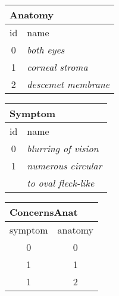 \begin{figure}[p]
    \begin{minipage}[][\textheight][c]{\textwidth}
        \begin{subfigure}{\linewidth}
            \centering
            \begin{adjustbox}{varwidth=\linewidth, max height=.2\textheight}
                \centering
                \begin{tabular}[t]{c|l}
                    \multicolumn{2}{l}{\textbf{Anatomy}} \\
                    \hline
                    \hline
                    id & name                            \\
                    \hline
                    0  & \emph{both eyes}                \\
                    1  & \emph{corneal stroma}           \\
                    2  & \emph{descemet membrane}
                \end{tabular}
                \quad
                \begin{tabular}[t]{c|l}
                    \multicolumn{2}{l}{\textbf{Symptom}}             \\
                    \hline
                    \hline
                    id & name                                        \\
                    \hline
                    0  & \emph{blurring of vision}                   \\
                    1  & \emph{numerous circular} \\
                       & \emph{to oval fleck-like}
                \end{tabular}
                \quad
                \begin{tabular}[t]{c|c}
                    \multicolumn{2}{l}{\textbf{ConcernsAnat}} \\
                    \hline
                    \hline
                    symptom & anatomy                         \\
                    \hline
                    0       & 0                               \\
                    1       & 1                               \\
                    1       & 2
                \end{tabular}
                \quad
                \begin{tabular}[t]{c|l}

\end{tabular}
\end{adjustbox}
\end{subfigure}
\end{minipage}
\end{figure}
